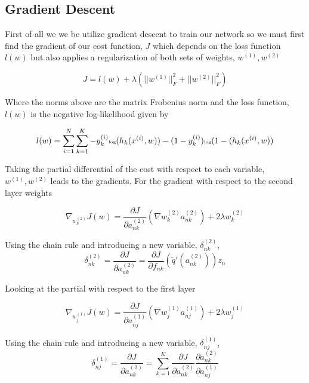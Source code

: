 \documentclass[12pt, twocolumn]{article}
\begin{document}
\subsection{Gradient Descent}
First of all we we be utilize gradient descent to train our network so  we must first find the gradient of our cost function, $J$ which depends on the loss function $l(w)$ but also applies a regularization of both sets of weights, $w^{(1)}, w^{(2)}$

\begin{equation}
J= l(w) + \lambda ( ||w^{(1)}||^2_F +||w^{(2)}||^2_F)
\end{equation}

Where the norms above are the matrix Frobenius norm and the loss function, $l(w)$ is the  negative log-likelihood given by 

\begin{equation}
\tiny
l(w)= \sum_{i=1}^N \sum_{k=1}^K -y^{(i)}_k \textrm{log}(h_k(x^{(i)}, w)) - (1 -y^{(i)}_k) \textrm{log}(1 -(h_k(x^{(i)}, w))
\end {equation}


Taking the partial differential of the cost with respect to each variable, $w^{(1)},w^{(2)}$ leads to the gradients. For the gradient with respect to the second layer weights 

\begin{equation}
\nabla_{w_k^{(2)}} J (w)= \frac{\partial J}{\partial a^{(2)}_{nk}}  (\nabla w_k^{(2)} a_{nk}^{(2)})  +2 \lambda w_k^{(2)}
\end{equation}

Using the chain rule and introducing a new variable, $\delta_{nk}^{(2)}$, 
\begin{equation}
\delta_{nk}^{(2)}=\frac{\partial J}{\partial a^{(2)}_{nk}} = \frac{\partial J}{\partial f_{nk}} (\tilde{q}' (a_{nk}^{(2)}))z_n
\end{equation}


Looking at the partial with respect to the first layer 


\begin{equation}
\nabla_{w_j^{(1)}} J (w)= \frac{\partial J}{\partial a^{(1)}_{nj}}  (\nabla w_j^{(1)} a_{nj}^{(1)}) + 2 \lambda w_j^{(1)}
\end{equation}

Using the chain rule and introducing a new variable, $\delta_{nj}^{(1)}$, 
\begin{equation}
\delta_{nj}^{(1)}= \frac{\partial J}{\partial a^{(2)}_{nk}} = \sum_{k=1}^K \frac{\partial J}{\partial a^{(2)}_{nk}}  \frac{\partial a_{nk}^{(2)}}{\partial a_{nj}^{(1)}} \end{equation}
\end{document}
